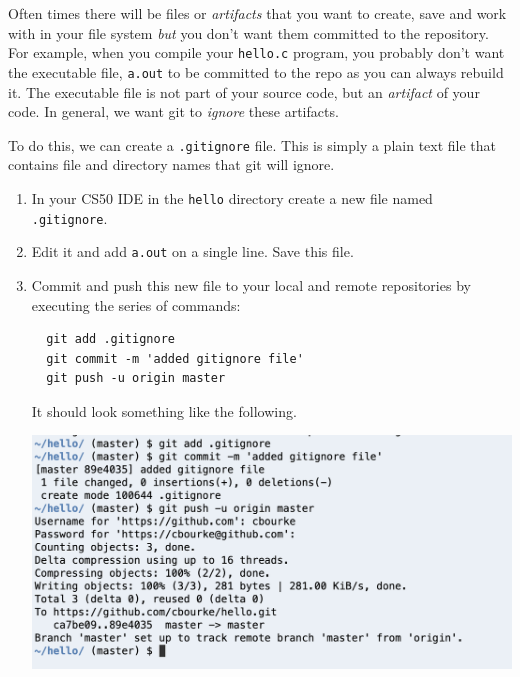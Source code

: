 \documentclass[12pt]{scrartcl}
\begin{document}
Often times there will be files or \emph{artifacts} that you want 
to create, save and work with in your file system \emph{but} you 
don't want them committed to the repository.  For example, when
you compile your \texttt{hello.c} program, you probably
don't want the executable file, \texttt{a.out} to be
committed to the repo as you can always rebuild it.  The executable
file is not part of your source code, but an \emph{artifact} of your 
code.  In general, we want git to \emph{ignore} these artifacts.

To do this, we can create a \texttt{.gitignore} file.  This
is simply a plain text file that contains file and directory names 
that git will ignore.  

\begin{enumerate}
  \item In your CS50 IDE in the \texttt{hello} directory
  create a new file named \texttt{.gitignore}.  

  \item Edit it and add \texttt{a.out} on a single line.
  Save this file.
  
  \item Commit and push this new file to your local and remote
  repositories by executing the series of commands:
  
  \begin{verbatim}
  git add .gitignore
  git commit -m 'added gitignore file'
  git push -u origin master
  \end{verbatim}
  
  It should look something like the following.
  
  \begin{center}
  \includegraphics[scale=0.50]{./hack1.0-files/cl-gitignore}
  \end{center}
  
\end{enumerate}
\end{document}
